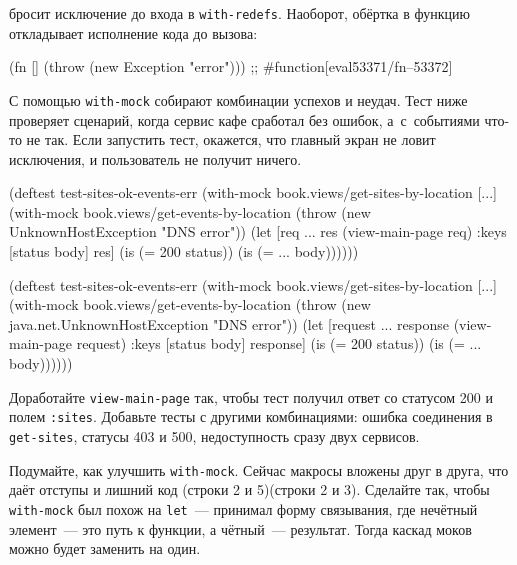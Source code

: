 \noindent
бросит исключение до входа в \verb|with-redefs|. Наоборот, обёртка в
функцию откладывает исполнение кода до вызова:

\begin{english}
  \begin{clojure}
(fn [] (throw (new Exception "error")))
;; #function[eval53371/fn--53372]
  \end{clojure}
\end{english}

С помощью \verb|with-mock| собирают комбинации успехов и неудач. Тест ниже
проверяет сценарий, когда сервис кафе сработал без ошибок, а~с~событиями что-то
не так. Если запустить тест, окажется, что главный экран не ловит исключения, и
пользователь не получит ничего.

\ifx\devicetype\mobile

\begin{english}
  \begin{clojure/lines}
(deftest test-sites-ok-events-err
  (with-mock
    book.views/get-sites-by-location
    [...]
    (with-mock
     book.views/get-events-by-location
     (throw
      (new UnknownHostException
        "DNS error"))
     (let [req {...}
           res (view-main-page req)
           {:keys [status body]} res]
       (is (= 200 status))
       (is (= {...} body))))))
  \end{clojure/lines}
\end{english}

\else

\begin{english}
  \begin{clojure/lines}
(deftest test-sites-ok-events-err
  (with-mock book.views/get-sites-by-location [...]
    (with-mock book.views/get-events-by-location
      (throw (new java.net.UnknownHostException "DNS error"))
      (let [request {...}
            response (view-main-page request)
            {:keys [status body]} response]
        (is (= 200 status))
        (is (= {...} body))))))
  \end{clojure/lines}
\end{english}

\fi

Доработайте \verb|view-main-page| так, чтобы тест получил ответ со статусом
200 и полем \verb|:sites|. Добавьте тесты с другими комбинациями: ошибка
соединения в \verb|get-sites|, статусы 403 и 500, недоступность сразу двух
сервисов.

Подумайте, как улучшить \verb|with-mock|. Сейчас макросы вложены друг в друга,
что даёт отступы и лишний код \ifx\devicetype\mobile(строки 2 и 5)\else(строки 2 и 3)\fi. Сделайте так, чтобы
\verb|with-mock| был похож на \verb|let|~--- принимал форму связывания, где
нечётный элемент~--- это путь к функции, а чётный~--- результат. Тогда каскад моков
можно будет заменить на один.


